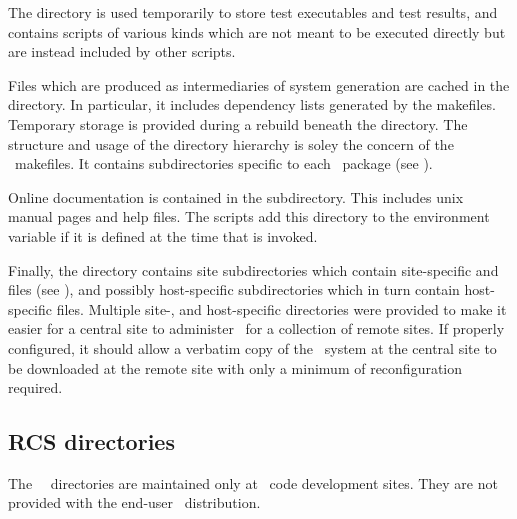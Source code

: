 The  directory is used temporarily to store test executables and
test results, and  contains scripts of various kinds which are
not meant to be executed directly but are instead included by other scripts.

Files which are produced as intermediaries of system generation are cached in
the  directory.  In particular, it includes dependency lists
generated by the makefiles.  Temporary storage is provided during a rebuild
beneath the  directory.  The structure and usage of the 
directory hierarchy is soley the concern of the \aipspp\ makefiles.  It
contains subdirectories specific to each \aipspp\ package (see
).

Online documentation is contained in the  subdirectory.  This
includes unix manual pages and help files.  The  scripts add
this directory to the  environment variable if it is defined at
the time that  is invoked.

Finally, the  directory contains site subdirectories which
contain site-specific  and  files (see
), and possibly host-specific subdirectories which
in turn contain host-specific  files.  Multiple site-, and
host-specific directories were provided to make it easier for a central site
to administer \aipspp\ for a collection of remote sites.  If properly
configured, it should allow a verbatim copy of the \aipspp\ system at the
central site to be downloaded at the remote site with only a minimum of
reconfiguration required.


\subsection{RCS directories}
\label{RCS directories}

The \aipspp\ \rcs\ directories are maintained only at \aipspp\ code
development sites.  They are not provided with the end-user \aipspp\ 
distribution.

